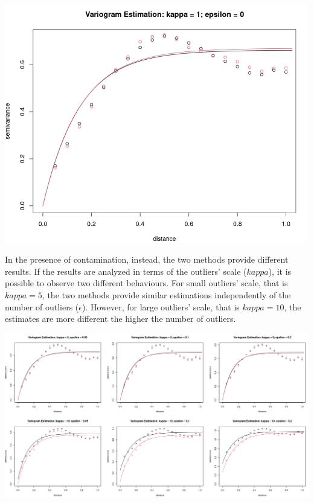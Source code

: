\documentclass[
  12pt]{article}
\begin{document}
\begin{center}
\includegraphics[width=5.20833in,height=\textheight]{img/variog_grf_ols.png}
\end{center}

In the presence of contamination, instead, the two methods provide
different results. If the results are analyzed in terms of the outliers'
scale (\(kappa\)), it is possible to observe two different behaviours.
For small outliers' scale, that is \(kappa = 5\), the two methods
provide similar estimations independently of the number of outliers
(\(\epsilon\)). However, for large outliers' scale, that is
\(kappa = 10\), the estimates are more different the higher the number
of outliers.

\begin{center}
\includegraphics[width=6.25in,height=\textheight]{img/variog_cgrf_ols.png}
\end{center}
\end{document}
